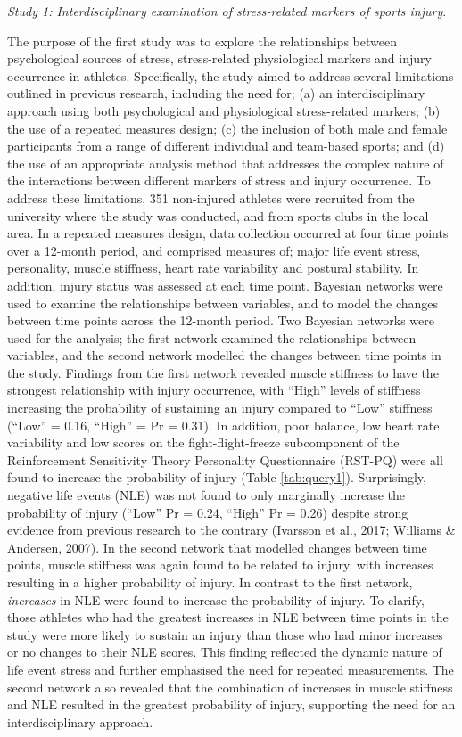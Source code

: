 \documentclass[
  english,
  man,floatsintext]{apa6}
\begin{document}
\emph{Study 1: Interdisciplinary examination of stress-related markers of sports injury}.

The purpose of the first study was to explore the relationships between psychological sources of stress, stress-related physiological markers and injury occurrence in athletes.
Specifically, the study aimed to address several limitations outlined in previous research, including the need for; (a) an interdisciplinary approach using both psychological and physiological stress-related markers; (b) the use of a repeated measures design; (c) the inclusion of both male and female participants from a range of different individual and team-based sports; and (d) the use of an appropriate analysis method that addresses the complex nature of the interactions between different markers of stress and injury occurrence. To address these limitations, 351 non-injured athletes were recruited from the university where the study was conducted, and from sports clubs in the local area.
In a repeated measures design, data collection occurred at four time points over a 12-month period, and comprised measures of; major life event stress, personality, muscle stiffness, heart rate variability and postural stability. In addition, injury status was assessed at each time point.
Bayesian networks were used to examine the relationships between variables, and to model the changes between time points across the 12-month period. Two Bayesian networks were used for the analysis; the first network examined the relationships between variables, and the second network modelled the changes between time points in the study.
Findings from the first network revealed muscle stiffness to have the strongest relationship with injury occurrence, with \enquote{High} levels of stiffness increasing the probability of sustaining an injury compared to \enquote{Low} stiffness (\enquote{Low} = 0.16, \enquote{High} = Pr = 0.31).
In addition, poor balance, low heart rate variability and low scores on the fight-flight-freeze subcomponent of the Reinforcement Sensitivity Theory Personality Questionnaire (RST-PQ) were all found to increase the probability of injury (Table \ref{tab:query1}).
Surprisingly, negative life events (NLE) was not found to only marginally increase the probability of injury (\enquote{Low} Pr = 0.24, \enquote{High} Pr = 0.26) despite strong evidence from previous research to the contrary (Ivarsson et al., 2017; Williams \& Andersen, 2007).
In the second network that modelled changes between time points, muscle stiffness was again found to be related to injury, with increases resulting in a higher probability of injury.
In contrast to the first network, \emph{increases} in NLE were found to increase the probability of injury.
To clarify, those athletes who had the greatest increases in NLE between time points in the study were more likely to sustain an injury than those who had minor increases or no changes to their NLE scores.
This finding reflected the dynamic nature of life event stress and further emphasised the need for repeated measurements.
The second network also revealed that the combination of increases in muscle stiffness and NLE resulted in the greatest probability of injury, supporting the need for an interdisciplinary approach.
\end{document}
